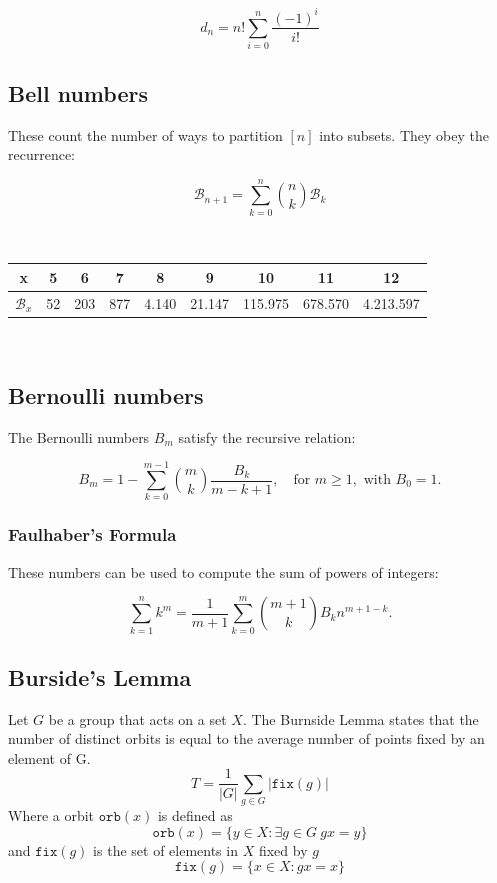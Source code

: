 $$d_n = n!\sum_{i=0}^{n}\frac{(-1)^i}{i!}$$

\subsection{Bell numbers} These count the number of ways to partition $[n]$ into subsets. They obey the recurrence:

\begin{equation*}
    \mathcal{B}_{n+1} = \sum_{k=0}^n \binom{n}{k} \mathcal{B}_k
\end{equation*}

\bigskip
\
\begin{tabular}{|c|c|c|c|c|c|c|c|c|}
\hline
\cellcolor{gray!40} x&5&6&7&8&9&10&11&12 \\ \hline
\cellcolor{gray!40} $\mathcal{B}_x$&52&203&877&4.140&21.147&115.975&678.570&4.213.597 \\ \hline
\end{tabular}
\

\subsection{Bernoulli numbers}

The Bernoulli numbers $B_m$ satisfy the recursive relation:

$$
B_m = 1 - \sum_{k=0}^{m - 1} \binom{m}{k} \frac{B_k}{m-k+1}, \quad \text{for } m \geq 1, \text{ with } B_0 = 1.
$$

\subsubsection*{Faulhaber's Formula}

These numbers can be used to compute the sum of powers of integers:

$$
\sum_{k=1}^{n} k^m = \frac{1}{m+1} \sum_{k=0}^{m} \binom{m+1}{k} B_k n^{m+1-k}.
$$

% 
% 


\subsection{Burside's Lemma}
    Let $G$ be a group that acts on a set $X$. The Burnside Lemma states that the number of distinct orbits is equal to the average number of points fixed by an element of G.
    $$T = \frac{1}{|G|} \sum_{g \in G} |\texttt{fix}(g)|$$
    Where a orbit $\texttt{orb}(x)$ is defined as
    $$\texttt{orb}(x) = \{y \in X : \exists g \in G \ gx = y \}$$
    and $\texttt{fix}(g)$ is the set of elements in $X$ fixed by $g$
    $$\texttt{fix}(g) = \{x \in X : gx = x\}$$
    
